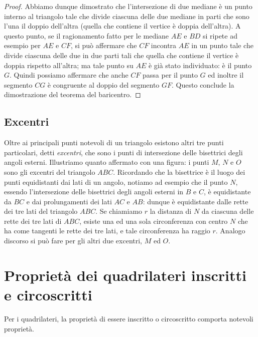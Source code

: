 \begin{proof}
Abbiamo dunque dimostrato che l'intersezione di due mediane è un punto interno al triangolo tale che divide ciascuna delle due mediane in parti che sono l'una il doppio dell'altra (quella che contiene il vertice è doppia dell'altra).
A questo punto, se il ragionamento fatto per le mediane $AE$ e $BD$ si ripete ad esempio per $AE$ e $CF$, si può affermare che $CF$ incontra $AE$ in un punto tale che divide ciascuna delle due in due parti tali che quella che contiene il vertice è doppia rispetto all'altra; ma tale punto su $AE$ è già stato individuato: è il punto $G$. Quindi possiamo affermare che anche $CF$ passa per il punto $G$ ed inoltre il segmento $CG$ è congruente al doppio del segmento $GF$. Questo conclude la dimostrazione del teorema del baricentro.
\end{proof}

\subsection{Excentri}

Oltre ai principali punti notevoli di un triangolo esistono altri tre punti particolari, detti \emph{excentri}, che sono i punti di intersezione delle bisettrici degli angoli esterni. Illustriamo quanto affermato con una figura: i punti $M$, $N$ e $O$ sono gli excentri del triangolo $ABC$. Ricordando che la bisettrice è il luogo dei punti equidistanti dai lati di un angolo, notiamo ad esempio che il punto $N$, essendo l'intersezione delle bisettrici degli angoli esterni in $B$ e $C$, è equidistante da $BC$ e dai prolungamenti dei lati $AC$ e $AB$: dunque è equidistante dalle rette dei tre lati del triangolo $ABC$. Se chiamiamo $r$ la distanza di $N$ da ciascuna delle rette dei tre lati di $ABC$, esiste una ed una sola circonferenza con centro $N$ che ha come tangenti le rette dei tre lati, e tale circonferenza ha raggio $r$. Analogo discorso si può fare per gli altri due excentri, $M$ ed $O$.

\begin{figure}[htb]
	\centering
\end{figure}


\section{Proprietà dei quadrilateri inscritti e circoscritti}

Per i quadrilateri, la proprietà di essere inscritto o circoscritto comporta notevoli proprietà.


